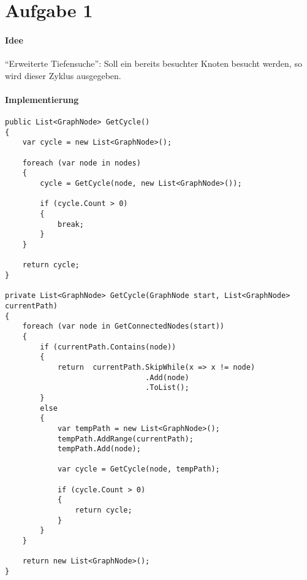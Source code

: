 \section*{Aufgabe 1}
\paragraph{Idee} \enquote{Erweiterte Tiefensuche}: Soll ein bereits besuchter Knoten besucht werden, so wird dieser Zyklus ausgegeben. 

\paragraph{Implementierung}
\begin{verbatim}
public List<GraphNode> GetCycle()
{
	var cycle = new List<GraphNode>();

	foreach (var node in nodes)
	{
		cycle = GetCycle(node, new List<GraphNode>());

		if (cycle.Count > 0)
		{
			break;
		}
	}

	return cycle;
}

private List<GraphNode> GetCycle(GraphNode start, List<GraphNode> currentPath)
{
	foreach (var node in GetConnectedNodes(start))
	{
		if (currentPath.Contains(node))
		{
			return  currentPath.SkipWhile(x => x != node)
								.Add(node)
								.ToList();
		}
		else
		{
			var tempPath = new List<GraphNode>();
			tempPath.AddRange(currentPath);
			tempPath.Add(node);

			var cycle = GetCycle(node, tempPath);

			if (cycle.Count > 0)
			{
				return cycle;
			}
		}
	}

	return new List<GraphNode>();
}
\end{verbatim}